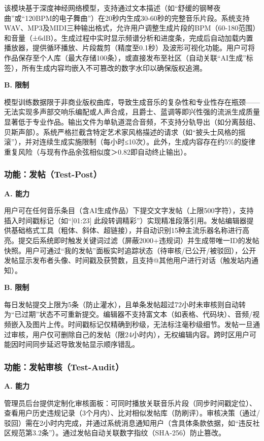 \documentclass{base}
\numberwithin{figure}{section} %
\begin{document}
该模块基于深度神经网络模型，支持通过文本描述（如“舒缓的钢琴夜曲”或“120BPM的电子舞曲”）在20秒内生成30-60秒的完整音乐片段。系统支持WAV、MP3及MIDI三种输出格式，允许用户调整生成片段的BPM（60-180范围）和音量（±6dB）。生成过程中实时显示频谱分析和进度条，完成后自动加载内置播放器，提供循环播放、片段裁剪（精度至0.1秒）及波形可视化功能。用户可将作品保存至个人库（最大存储100条），或直接发布至社区（自动关联“AI生成”标签），所有生成内容均嵌入不可篡改的数字水印以确保版权追溯。

\textbf{B. 限制}

模型训练数据限于非商业版权曲库，导致生成音乐的复杂性和专业性存在瓶颈——无法实现多声部交响乐编配或人声合成，且爵士、蓝调等即兴性强的流派生成质量显著低于专业作品。输出文件为单轨道混合音频，不支持分轨导出（如分离鼓组、贝斯声部）。系统严格拦截含特定艺术家风格描述的请求（如“披头士风格的摇滚”），并对连续生成实施限制（每小时≤10次）。此外，生成内容存在约5\%的旋律重复风险（与现有作品余弦相似度＞0.82即自动终止输出）。

\subsubsection{功能：发帖（Test-Post）}

\textbf{A. 能力}

用户可在任何音乐条目（含AI生成作品）下提交文字发帖（上限500字符），支持插入时间戳标记（如“[01:23] 此段转调精彩”）实现精准段落引用。发帖编辑器提供基础格式工具（粗体、斜体、超链接），并自动识别15种主流乐器名称进行高亮。提交后系统即时触发关键词过滤（屏蔽2000+违规词）并生成带唯一ID的发帖快照。用户可通过“我的发帖”面板实时追踪状态（待审核/已公开/被驳回），公开发帖显示发布者头像、时间戳及获赞数，且支持@其他用户进行对话（触发站内通知）。

\textbf{B. 限制}

每日发帖提交上限为5条（防止灌水），且单条发帖超过72小时未审核则自动转为“已过期”状态不可重新提交。编辑器不支持富文本（如表格、代码块）、音频/视频嵌入及图片上传。时间戳标记仅精确到秒级，无法标注毫秒级细节。发帖一旦通过审核，用户仅可删除自己的发帖（限24小时内），无权编辑内容。跨时区用户可能因时间同步延迟导致发帖显示顺序错乱。

\subsubsection{功能：发帖审核（Test-Audit）}

\textbf{A. 能力}

管理员后台提供定制化审核面板：可同时播放关联音乐片段（同步时间戳定位）、查看用户历史违规记录（3个月内）、比对相似发帖库（防刷评）。审核决策（通过/驳回）需在2小时内完成，并通过系统消息通知用户（含具体条款依据，如“违反社区规范第3.2条”）。通过发帖自动关联数字指纹（SHA-256）防止篡改。
\end{document}
